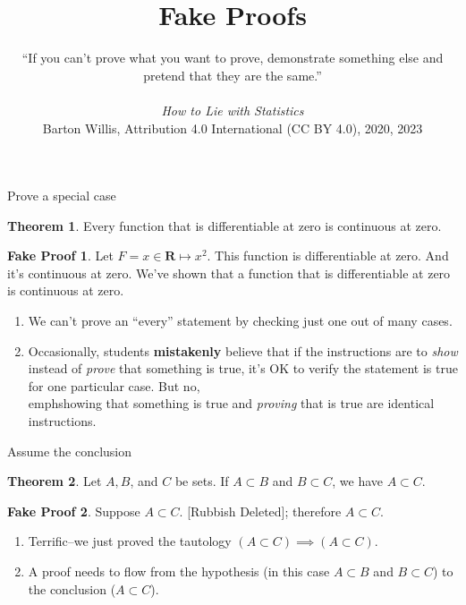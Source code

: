 \documentclass[fleqn]{beamer}
\title{\textbf{Fake Proofs}}
\subtitle{%
  ``If you can't prove what you want to prove, demonstrate something else and pretend that they are the same.''  \\   \vspace{0.15in}{Darrell Huff} \\ \vspace{0.15in} \emph{How to Lie with Statistics} \\ 
 \vspace{1.0in}
  \tiny Barton Willis, Attribution 4.0 International (CC BY 4.0), 2020, 2023 \normalsize
   }
\date{}
\newcommand{\reals}{\mathbf{R}}
\theoremstyle{definition}
\newtheorem{myth}{Theorem}
\newtheorem{myfakeproof}{Fake Proof}
\begin{document}
\frame{\titlepage}

\begin{frame}{Prove a special case}

\begin{myth}   Every function  that is differentiable at zero is continuous at zero.  \end{myth}

\begin{myfakeproof}  Let \(F = x \in \reals \mapsto x^2\).  This function is 
  differentiable at zero. And it's continuous at zero. We've shown that  a 
  function that is differentiable at zero is continuous at zero.
\end{myfakeproof}

\begin{enumerate}
\item We can't prove an ``every'' statement by checking just one out of many cases.
\item Occasionally, students \textbf{mistakenly} believe that if the instructions are 
to \emph{show} instead of \emph{prove} that something is true, it's OK to verify the 
statement is true for one particular case. But no, \\emph{showing} that something is 
true and  \emph{proving} that is true are identical instructions.


\end{enumerate}

\end{frame}

\begin{frame}{Assume the conclusion}


\begin{myth}   Let \(A,B\),  and \(C\) be sets.  If \(A \subset B\) and \(B \subset C\), we have \(A \subset C\). \end{myth}

\begin{myfakeproof}  Suppose \(A \subset C\).  [Rubbish Deleted]; therefore  \(A \subset C\). \end{myfakeproof}

\begin{enumerate}
\item Terrific--we just proved the tautology \(   (A \subset C) \implies  (A \subset C) \).

\item A proof needs to flow from the hypothesis (in this case  \(A \subset B\) and \(B \subset C\)) to the conclusion (\(A \subset C\)).
\end{enumerate}

\end{frame}
\end{document}
